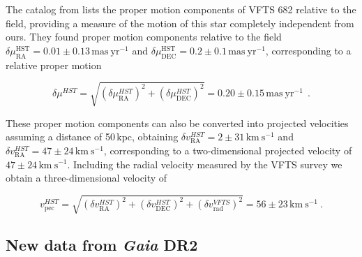 \documentclass[apjl,twocolumn]{emulateapj}
\newcommand{\kms}{{\,\mathrm{km\ s^{-1}}}}
\begin{document}
The catalog from \citet{platais:18} lists the proper motion
components of VFTS 682 relative to the field, providing a
measure of the motion of this star completely independent from
ours. They found proper
motion components relative to the field
$\delta\mu_\mathrm{RA}^\mathrm{HST} = 0.01\pm0.13\,\mathrm{mas\
  yr^{-1}}$ and
$\delta\mu_\mathrm{DEC}^\mathrm{HST}=0.2\pm0.1\,\mathrm{mas\
  yr^{-1}}$, corresponding to a relative proper motion 

\begin{equation}
  \label{eq:pm_around_HST}
  \delta \mu^{HST} = \sqrt{\left(\delta\mu_\mathrm{RA}^{HST}\right)^2+\left(\delta\mu_\mathrm{DEC}^{HST}\right)^2}
  = 0.20 \pm 0.15\,\mathrm{mas\
  yr^{-1}} \ \ .
\end{equation}

These proper motion components can also be converted into projected
velocities assuming a distance of 50\,kpc, obtaining $\delta
v_\mathrm{RA}^{HST}=2\pm31\kms$ and $\delta
v_\mathrm{RA}^{HST}=47\pm24\kms$, corresponding to a two-dimensional
projected velocity of $47\pm24\kms$. Including the radial velocity
measured by the VFTS survey we obtain a three-dimensional velocity of

\begin{equation}
  \label{eq:speed_around_HST}
  v_\mathrm{pec}^{HST} = \sqrt{\left(\delta v_\mathrm{RA}^{HST}\right)^2
    +\left(\delta v_\mathrm{DEC}^{HST}\right)^2+\left(\delta
      v_\mathrm{rad}^{VFTS}\right)^2} = 56 \pm 23
  \kms \ .
\end{equation}


\subsection{New data from \emph{Gaia} DR2  \label{data:gaia}}
\end{document}
